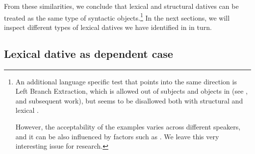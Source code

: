 \documentclass[output=paper,modfonts,newtxmath,hidelinks]{langscibook}
\begin{document}
\largerpage
\noindent From these similarities, we conclude that lexical and structural datives can be treated as the same type of syntactic objects.\footnote{An additional language specific test that points into the same direction is Left Branch Extraction, which is allowed out of subjects  and objects  in  (see \citealt{bosk2005}, and subsequent work), but seems to be disallowed both with structural  and lexical  .
	
	\ea
	\label{16:fn5exia}
	\label{16:fn5exib}
	\label{16:fn5exic}
	\label{16:fn5exid}
    \z \z 
	
\noindent However, the acceptability of the examples varies across different speakers, and it can be also influenced by factors such as . We leave this very interesting issue for  research.} In the next sections, we will inspect different types of lexical datives we have identified in  in turn. 



\subsection{Lexical dative as dependent case}
\end{document}
